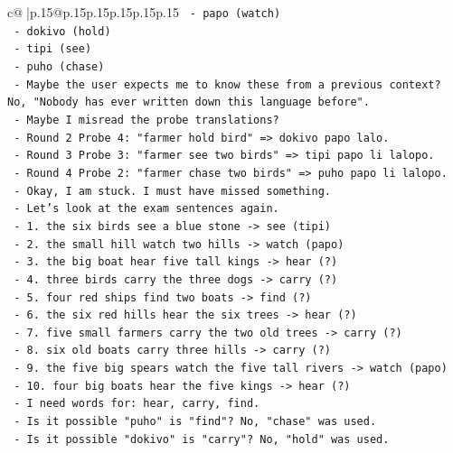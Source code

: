 \documentclass{article}
\begin{document}
{\begin{supertabular}{c@{$\;$}|p{.15\linewidth}@{}p{.15\linewidth}p{.15\linewidth}p{.15\linewidth}p{.15\linewidth}p{.15\linewidth}}
{{{\texttt{       {-} papo (watch)} \\
\texttt{       {-} dokivo (hold)} \\
\texttt{       {-} tipi (see)} \\
\texttt{       {-} puho (chase)} \\
\texttt{     {-} Maybe the user expects me to know these from a previous context? No, "Nobody has ever written down this language before".} \\
\texttt{     {-} Maybe I misread the probe translations?} \\
\texttt{       {-} Round 2 Probe 4: "farmer hold bird" => dokivo papo lalo.} \\
\texttt{       {-} Round 3 Probe 3: "farmer see two birds" => tipi papo li lalopo.} \\
\texttt{       {-} Round 4 Probe 2: "farmer chase two birds" => puho papo li lalopo.} \\
\texttt{     {-} Okay, I am stuck. I must have missed something.} \\
\texttt{     {-} Let's look at the exam sentences again.} \\
\texttt{     {-} 1. the six birds see a blue stone {-}> see (tipi)} \\
\texttt{     {-} 2. the small hill watch two hills {-}> watch (papo)} \\
\texttt{     {-} 3. the big boat hear five tall kings {-}> hear (?)} \\
\texttt{     {-} 4. three birds carry the three dogs {-}> carry (?)} \\
\texttt{     {-} 5. four red ships find two boats {-}> find (?)} \\
\texttt{     {-} 6. the six red hills hear the six trees {-}> hear (?)} \\
\texttt{     {-} 7. five small farmers carry the two old trees {-}> carry (?)} \\
\texttt{     {-} 8. six old boats carry three hills {-}> carry (?)} \\
\texttt{     {-} 9. the five big spears watch the five tall rivers {-}> watch (papo)} \\
\texttt{     {-} 10. four big boats hear the five kings {-}> hear (?)} \\
\texttt{     {-} I need words for: hear, carry, find.} \\
\texttt{     {-} Is it possible "puho" is "find"? No, "chase" was used.} \\
\texttt{     {-} Is it possible "dokivo" is "carry"? No, "hold" was used.} \\
}}}
\end{supertabular}}
\end{document}
